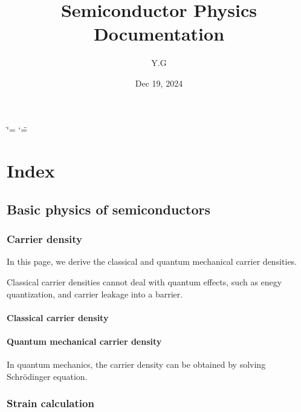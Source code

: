 \documentclass[letterpaper,10pt,english]{sphinxmanual}
\title{Semiconductor Physics Documentation}
\date{Dec 19, 2024}
\author{Y.G}
\numberwithin{equation}{section}
\begin{document}
\ifdefined\shorthandoff
  \ifnum\catcode`\=\string=\active\shorthandoff{=}\fi
  \ifnum\catcode`\"=\active{}\fi
\fi

\pagestyle{empty}
\sphinxmaketitle
\pagestyle{plain}
\sphinxtableofcontents
\pagestyle{normal}
\label{\detokenize{index::doc}}



\chapter{Index}
\label{\detokenize{index:index}}
\sphinxstepscope


\section{Basic physics of semiconductors}
\label{\detokenize{Basic_physics_of_semiconductors:basic-physics-of-semiconductors}}\label{\detokenize{Basic_physics_of_semiconductors::doc}}
\sphinxstepscope


\subsection{Carrier density}
\label{\detokenize{carrier_density:carrier-density}}\label{\detokenize{carrier_density::doc}}
\sphinxAtStartPar
In this page, we derive the classical and quantum mechanical carrier densities.

\sphinxAtStartPar
Classical carrier densities cannot deal with quantum effects, such as enegy quantization, and carrier leakage into a barrier.


\subsubsection{Classical carrier density}
\label{\detokenize{carrier_density:classical-carrier-density}}

\subsubsection{Quantum mechanical carrier density}
\label{\detokenize{carrier_density:quantum-mechanical-carrier-density}}
\sphinxAtStartPar
In quantum mechanics, the carrier density can be obtained by solving Schrödinger equation.

\sphinxstepscope


\subsection{Strain calculation}
\label{\detokenize{strain_calculation:strain-calculation}}\label{\detokenize{strain_calculation::doc}}
\sphinxstepscope
\end{document}
